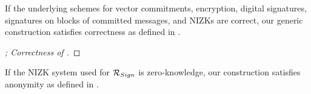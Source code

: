 \begin{theorem}
  \label{thm:correctness-uas}
  If the underlying schemes for vector commitments, encryption, digital
  signatures, signatures on blocks of committed messages, and NIZKs are
  correct, our generic construction \CUASGen satisfies correctness as
  defined in .
\end{theorem}

\begin{proof}[; Correctness of \CUASGen]
\end{proof}

\begin{theorem}
  \label{thm:anonymity-uas}
  If the NIZK system used for $\mathcal{R}_{Sign}$ is zero-knowledge, our
  \CUASGen construction satisfies anonymity as defined in
  .
\end{theorem}

